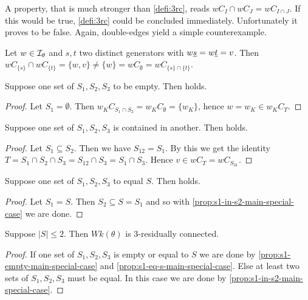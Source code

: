 A property, that is much stronger than \ref{defi:3rc}, reads $wC_I \cap wC_J = wC_{I \cap J}$. If this would be true, \ref{defi:3rc} could be concluded immediately. Unfortunately it proves to be false. Again, double-edges yield a simple counterexample.

\begin{exam}
	Let $w \in \mathcal{I}_{\theta}$ and $s,t$ two distinct generators with $w \underline{s} = w \underline{t} = v$. Then $wC_{\{s\}} \cap wC_{\{t\}} = \{w,v\} \neq \{w\} = wC_{\emptyset} = wC_{\{s\} \cap \{t\}}$.
\end{exam}

\begin{prop}
	Suppose one set of $S_1,S_2,S_3$ to be empty. Then  holds.

	\begin{proof}
		Let $S_1 = \emptyset$. Then $w_K C_{S_1 \cap S_2} = w_K C_\emptyset = \{ w_K \}$, hence $w = w_K \in w_K C_T$.
	\end{proof}
\end{prop}

\begin{prop}
	Suppose one set of $S_1,S_2,S_3$ is contained in another. Then  holds.

	\begin{proof}
		Let $S_1 \subseteq S_2$. Then we have $S_{12} = S_1$. By this we get the identity $T = S_1 \cap S_2 \cap S_3 = S_{12} \cap S_3 = S_1 \cap S_3$. Hence $v \in w C_T = w C_{S_{31}}$.
	\end{proof}
\end{prop}

\begin{coro}
	Suppose one set of $S_1,S_2,S_3$ to equal $S$. Then  holds.

	\begin{proof}
		Let $S_1 = S$. Then $S_2 \subseteq S = S_1$ and so with \ref{prop:s1-in-s2-main-special-case} we are done.
	\end{proof}
\end{coro}

\begin{coro}
	Suppose $|S| \leq 2$. Then $Wk(\theta)$ is 3-residually connected.

	\begin{proof}
		If one set of $S_1,S_2,S_3$ is empty or equal to $S$ we are done by \ref{prop:s1-empty-main-special-case} and \ref{prop:s1-eq-s-main-special-case}. Else at least two sets of $S_1,S_2,S_3$ must be equal. In this case we are done by \ref{prop:s1-in-s2-main-special-case}.
	\end{proof}
\end{coro}